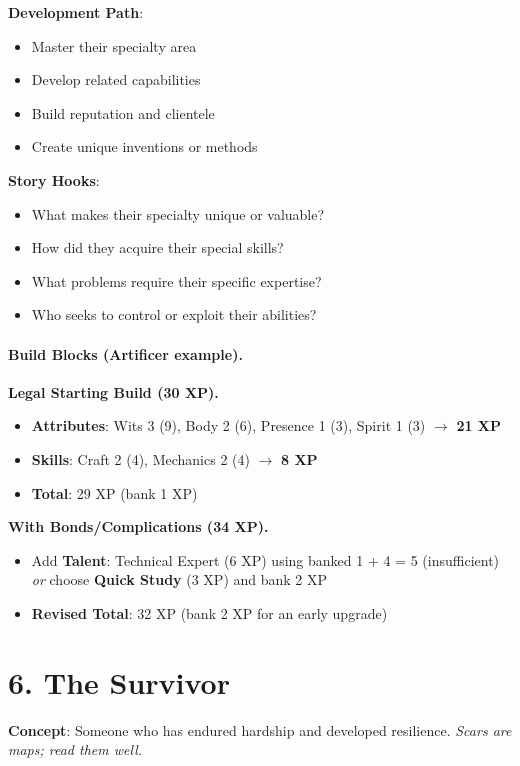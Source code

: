 \begin{multicols}{2}
\textbf{Development Path}:
\begin{itemize}
\item Master their specialty area
\item Develop related capabilities
\item Build reputation and clientele
\item Create unique inventions or methods
\end{itemize}

\textbf{Story Hooks}:
\begin{itemize}
\item What makes their specialty unique or valuable?
\item How did they acquire their special skills?
\item What problems require their specific expertise?
\item Who seeks to control or exploit their abilities?
\end{itemize}

\paragraph{Build Blocks (Artificer example).}
\textbf{Legal Starting Build (30 XP).}
\begin{itemize}
\item \textbf{Attributes}: Wits 3 (9), Body 2 (6), Presence 1 (3), Spirit 1 (3) $\rightarrow$ \textbf{21 XP}
\item \textbf{Skills}: Craft 2 (4), Mechanics 2 (4) $\rightarrow$ \textbf{8 XP}
\item \textbf{Total}: 29 XP (bank 1 XP)
\end{itemize}
\textbf{With Bonds/Complications (34 XP).}
\begin{itemize}
\item Add \textbf{Talent}: Technical Expert (6 XP) using banked 1 + 4 = 5 (insufficient) \emph{or} choose \textbf{Quick Study} (3 XP) and bank 2 XP
\item \textbf{Revised Total}: 32 XP (bank 2 XP for an early upgrade)
\end{itemize}

\section{6. The Survivor}

\textbf{Concept}: Someone who has endured hardship and developed resilience. \emph{Scars are maps; read them well.}


\end{multicols}
